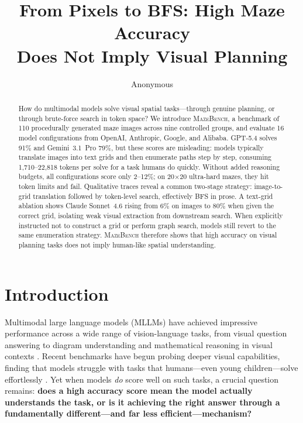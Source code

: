 \documentclass[11pt]{article}
\title{From Pixels to BFS: High Maze Accuracy\\Does Not Imply Visual Planning}
\author{Anonymous}
\begin{document}
\maketitle
\setcounter{figure}{1}

\begin{abstract}
How do multimodal models solve visual spatial tasks---through genuine planning, or through brute-force search in token space?
We introduce \textsc{MazeBench}, a benchmark of 110 procedurally generated maze images across nine controlled groups, and evaluate 16 model configurations from OpenAI, Anthropic, Google, and Alibaba.
GPT-5.4 solves 91\% and Gemini~3.1~Pro 79\%, but these scores are misleading: models typically translate images into text grids and then enumerate paths step by step, consuming 1,710--22,818 tokens per solve for a task humans do quickly.
Without added reasoning budgets, all configurations score only 2--12\%; on 20$\times$20 ultra-hard mazes, they hit token limits and fail.
Qualitative traces reveal a common two-stage strategy: image-to-grid translation followed by token-level search, effectively BFS in prose.
A text-grid ablation shows Claude Sonnet~4.6 rising from 6\% on images to 80\% when given the correct grid, isolating weak visual extraction from downstream search.
When explicitly instructed not to construct a grid or perform graph search, models still revert to the same enumeration strategy.
\textsc{MazeBench} therefore shows that high accuracy on visual planning tasks does not imply human-like spatial understanding.
\end{abstract}

\section{Introduction}

Multimodal large language models (MLLMs) have achieved impressive performance across a wide range of vision-language tasks, from visual question answering to diagram understanding and mathematical reasoning in visual contexts \cite{lu2024mathvista, yue2024mmmu, fu2024mme}.
Recent benchmarks have begun probing deeper visual capabilities, finding that models struggle with tasks that humans---even young children---solve effortlessly \cite{fu2024blink, tong2024eyes, chen2026babyvision}.
Yet when models \emph{do} score well on such tasks, a crucial question remains: \textbf{does a high accuracy score mean the model actually understands the task, or is it achieving the right answer through a fundamentally different---and far less efficient---mechanism?}
\end{document}
